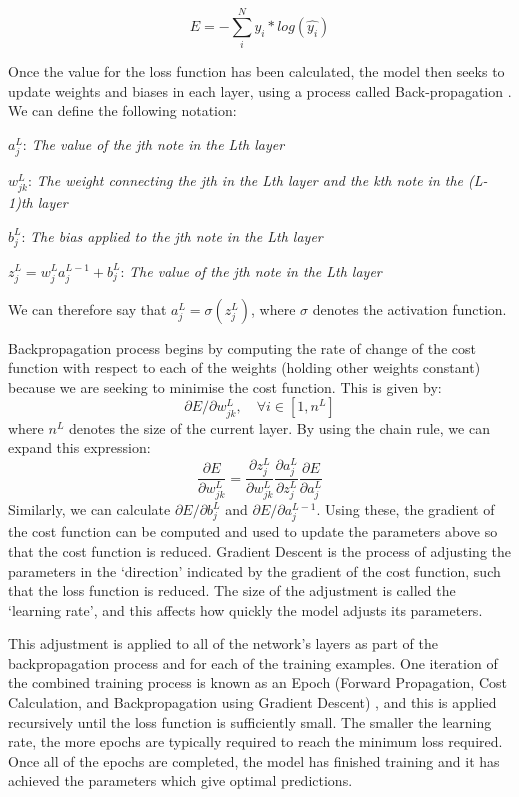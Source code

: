 $$E = -\sum_i^N y_i*log(\hat{y_i})$$

Once the value for the loss function has been calculated, the model then seeks to update weights and biases in each layer, using a process called Back-propagation \citep{Rumelhart}. We can define the following notation:

$a_j^L$: \textit{The value of the jth note in the Lth layer}

$w_{jk}^L$: \textit{The weight connecting the jth in the Lth layer and the kth note in the (L-1)th layer}

$b_j^L$: \textit{The bias applied to the jth note in the Lth layer}

$z_j^L = w_j^L a_j^{L-1} + b_j^L$: \textit{The value of the jth note in the Lth layer}

We can therefore say that $a_j^L = \sigma(z_j^L)$, where $\sigma$ denotes the activation function.

Backpropagation process begins by computing the rate of change of the cost function with respect to each of the weights (holding other weights constant) because we are seeking to minimise the cost function. This is given by:
$$\partial E/ \partial w_{jk}^L,\quad \forall  i \in [1,n^L]$$ where $n^L$ denotes the size of the current layer. By using the chain rule, we can expand this expression:
$$\frac{\partial E}{\partial w_{jk}^L} = \frac{\partial z_j^L}{\partial w_{jk}^L} \frac{\partial a_j^L}{\partial z_j^L} \frac{\partial E}{\partial a_j^L}$$ %
Similarly, we can calculate $\partial E/ \partial b_j^L$ and $\partial E/ \partial a_j^{L-1}$. Using these, the gradient of the cost function can be computed and used to update the parameters above so that the cost function is reduced. Gradient Descent is the process of adjusting the parameters in the `direction' indicated by the gradient of the cost function, such that the loss function is reduced. The size of the adjustment is called the `learning rate', and this affects how quickly the model adjusts its parameters.

This adjustment is applied to all of the network's layers as part of the backpropagation process and for each of the training examples. One iteration of the combined training process is known as an Epoch (Forward Propagation, Cost Calculation, and Backpropagation using Gradient Descent) \citep{Sharma}, and this is applied recursively until the loss function is sufficiently small. The smaller the learning rate, the more epochs are typically required to reach the minimum loss required. Once all of the epochs are completed, the model has finished training and it has achieved the parameters which give optimal predictions.

